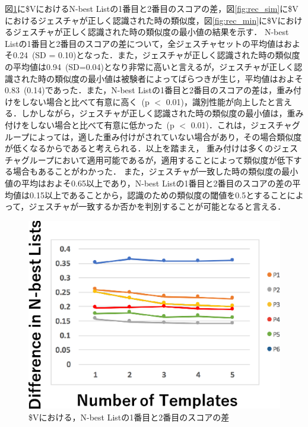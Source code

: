 図\ref{fig:rec_diff}に\$VにおけるN-best Listの1番目と2番目のスコアの差，図\ref{fig:rec_sim}に\$Vにおけるジェスチャが正しく認識された時の類似度，図\ref{fig:rec_min}に\$Vにおけるジェスチャが正しく認識された時の類似度の最小値の結果を示す．
N-best Listの1番目と2番目のスコアの差について，全ジェスチャセットの平均値はおよそ0.24~(SD = 0.10)となった．また，ジェスチャが正しく認識された時の類似度の平均値は0.94~(SD=0.04)となり非常に高いと言えるが，ジェスチャが正しく認識された時の類似度の最小値は被験者によってばらつきが生じ，平均値はおよそ0.83~(0.14)であった．また，N-best Listの1番目と2番目のスコアの差は，重み付けをしない場合と比べて有意に高く~(p $<$ 0.01)，識別性能が向上したと言える．しかしながら，ジェスチャが正しく認識された時の類似度の最小値は，重み付けをしない場合と比べて有意に低かった~(p $<$ 0.01)．これは，ジェスチャグループによっては，適した重み付けがされていない場合があり，その場合類似度が低くなるからであると考えられる．以上を踏まえ，%
重み付けは多くのジェスチャグループにおいて適用可能であるが，適用することによって類似度が低下する場合もあることがわかった．
また，ジェスチャが一致した時の類似度の最小値の平均はおよそ0.65以上であり，N-best Listの1番目と2番目のスコアの差の平均値は0.15以上であることから，認識のための類似度の閾値を0.5とすることによって，ジェスチャが一致するか否かを判別することが可能となると言える．
\begin{figure}[!h]
\centering
\includegraphics[width=0.7\columnwidth]{img/rec_diff.eps}
\caption{\$Vにおける，N-best Listの1番目と2番目のスコアの差}
\label{fig:rec_diff}
\end{figure}


